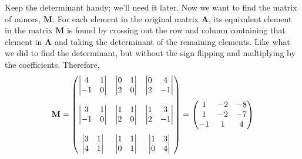\documentclass[../main.tex]{subfile}
\begin{document}
Keep the determinant handy; we'll need it later. Now we want to find the matrix of minors, $\mathbf{M}$. For each element in the original matrix $\mathbf{A}$, its equivalent element in the matrix $\mathbf{M}$ is found by crossing out the row and column containing that element in $\mathbf{A}$ and taking the determinant of the remaining elements. Like what we did to find the determinant, but without the sign flipping and multiplying by the coefficients. Therefore,
$$\mathbf{M} = \begin{pmatrix}
	\begin{vmatrix}4 & 1\\ -1 & 0\end{vmatrix} & \begin{vmatrix}0 & 1\\ 2 & 0\end{vmatrix} & \begin{vmatrix}0 & 4\\ 2 & -1\end{vmatrix}\\
	\hphantom{} & \hphantom{} & \hphantom{}\\
	\begin{vmatrix}3 & 1\\ -1 & 0\end{vmatrix} & \begin{vmatrix}1 & 1\\ 2 & 0\end{vmatrix} & \begin{vmatrix}1 & 3\\ 2 & -1\end{vmatrix}\\
	\hphantom{} & \hphantom{} & \hphantom{}\\
	\begin{vmatrix}3 & 1\\ 4 & 1\end{vmatrix} & \begin{vmatrix}1 & 1\\ 0 & 1\end{vmatrix} & \begin{vmatrix}1 & 3\\ 0 & 4\end{vmatrix}\\
\end{pmatrix}
= \begin{pmatrix}1 & -2 & -8\\ 1 & -2 & -7\\ -1 & 1 & 4\end{pmatrix}$$
\end{document}
